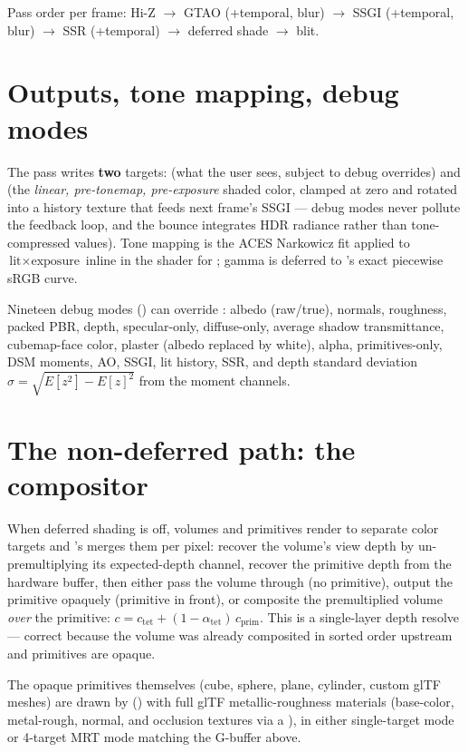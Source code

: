 Pass order per frame: Hi-Z $\to$ GTAO (+temporal, blur) $\to$ SSGI
(+temporal, blur) $\to$ SSR (+temporal) $\to$ deferred shade $\to$ blit.

\section{Outputs, tone mapping, debug modes}

The pass writes \textbf{two} targets:  (what the user sees,
subject to debug overrides) and  (the \emph{linear, pre-tonemap,
pre-exposure} shaded color, clamped at zero and rotated into a history
texture that feeds next frame's SSGI --- debug modes never pollute the
feedback loop, and the bounce integrates HDR radiance rather than
tone-compressed values). Tone mapping is the ACES Narkowicz fit applied to
$\text{lit} \times \text{exposure}$ inline in the shader for
; gamma is deferred to 's exact piecewise
sRGB curve.

Nineteen debug modes () can override : albedo
(raw/true), normals, roughness, packed PBR, depth, specular-only,
diffuse-only, average shadow transmittance, cubemap-face color, plaster
(albedo replaced by white), alpha, primitives-only, DSM moments, AO, SSGI,
lit history, SSR, and depth standard deviation
$\sigma = \sqrt{E[z^2] - E[z]^2}$ from the moment channels.

\section{The non-deferred path: the compositor}

When deferred shading is off, volumes and primitives render to separate
color targets and 's  merges
them per pixel: recover the volume's view depth by un-premultiplying its
expected-depth channel, recover the primitive depth from the hardware
buffer, then either pass the volume through (no primitive), output the
primitive opaquely (primitive in front), or composite the premultiplied
volume \emph{over} the primitive:
$c = c_{\text{tet}} + (1 - \alpha_{\text{tet}})\, c_{\text{prim}}$.
This is a single-layer depth resolve --- correct because the volume was
already composited in sorted order upstream and primitives are opaque.

The opaque primitives themselves (cube, sphere, plane, cylinder, custom glTF
meshes) are drawn by 
() with full glTF metallic-roughness materials
(base-color, metal-rough, normal, and occlusion textures via a
), in either single-target mode or 4-target MRT mode
matching the G-buffer above.


